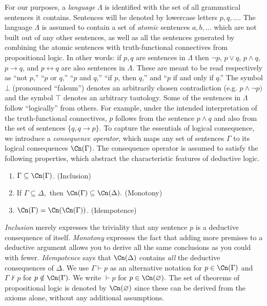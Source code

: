 For our purposes, a {\em language} $\Lambda$ is identified with the set of all
grammatical sentences it contains. Sentences will be denoted by lowercase
letters $p, q, \ldots$. The language $\Lambda$ is assumed to contain a set of
{\em atomic} sentences $a,b, \ldots$ which are not built out of any other
sentences, as well as all the sentences generated by combining the atomic
sentences with  truth-functional connectives from propositional logic. In other
words: if $p,q$ are sentences in $\Lambda$ then $\neg p$, $p\vee q$, $p\wedge
q$, $p\rightarrow q$, and  $p \leftrightarrow q$ are also sentences in
$\Lambda$. These are meant to be read respectively as ``not $p$,'' ``$p$ or
$q$,'' ``$p$ and $q$,'' ``if $p$, then $q$,'' and ``$p$ if and only if $q$.''
The symbol $\bot$ (pronounced ``falsum'') denotes an arbitrarily chosen
contradiction (e.g. $p\wedge \neg p)$ and the symbol $\top$ denotes an arbitrary
tautology. Some of the sentences in $\Lambda$ follow ``logically'' from others.
For example, under the intended interpretation of the truth-functional
connectives, $p$ follows from the sentence $p\wedge q$ and also from the set of
sentences $\{q, q\rightarrow p \}$. To capture the essentials of logical
consequence, we introduce a {\em consequence operator}, which maps any set of
sentences $\Gamma$ to its logical consequences $\Cn(\Gamma)$. The consequence
operator is assumed to satisfy the following properties, which abstract the
characteristic features of deductive logic.
\begin{enumerate}
\item[] $\Gamma \subseteq \Cn(\Gamma)$. \hfill (Inclusion)
\item[] If $\Gamma\subseteq \Delta,$ then $\Cn(\Gamma) \subseteq \Cn(\Delta).$
\hfill (Monotony)
\item[] $\Cn(\Gamma)=\Cn(\Cn(\Gamma))$. \hfill (Idempotence)
\end{enumerate}
{\em Inclusion} merely expresses the triviality that any sentence  $p$ is a
deductive consequence of itself. {\em Monotony} expresses the fact that adding
more premises to a deductive argument allows you to derive all the same
conclusions as you could with fewer. {\em Idempotence} says that $\Cn(\Delta)$
contains {\em all} the deductive consequences of $\Delta$. We use $\Gamma \vdash
p$ as an alternative notation for $p \in \Cn(\Gamma)$ and $\Gamma \nvdash p$ for
$p\notin \Cn(\Gamma).$ We write $\vdash p$ for $p\in \Cn(\varnothing).$ The set
of theorems of propositional logic is denoted by $\Cn(\varnothing)$ since these
can be derived from the axioms alone, without any additional assumptions.

